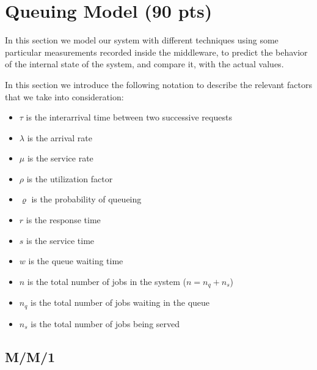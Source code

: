 \documentclass[11pt,a4paper]{article}
\begin{document}
\section{Queuing Model (90 pts)}

In this section we model our system with different techniques using some particular measurements recorded inside the middleware, to predict the behavior of the internal state of the system, and compare it, with the actual values.

In this section we introduce the following notation to describe the relevant factors that we take into consideration:

\begin{itemize}
    \item $\tau$ is the interarrival time between two successive requests
    \item $\lambda$ is the arrival rate
    \item $\mu$ is the service rate
    \item $\rho$ is the utilization factor
    \item $\varrho$ is the probability of queueing
    \item $r$ is the response time
    \item $s$ is the service time
    \item $w$ is the queue waiting time
    \item $n$ is the total number of jobs in the system ($n = n_q + n_s$)
    \item $n_q$ is the total number of jobs waiting in the queue
    \item $n_s$ is the total number of jobs being served
\end{itemize}

\subsection{M/M/1}
\end{document}

